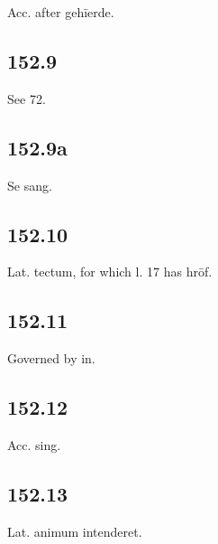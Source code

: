 Acc. after gehīerde.

\subsection*{152.9}

See 72.

\subsection*{152.9a}

Se sang.

\subsection*{152.10}

Lat. tectum, for which l. 17 has hrōf.

\subsection*{152.11}

Governed by in.

\subsection*{152.12}

Acc. sing.

\subsection*{152.13}

Lat. animum intenderet.

